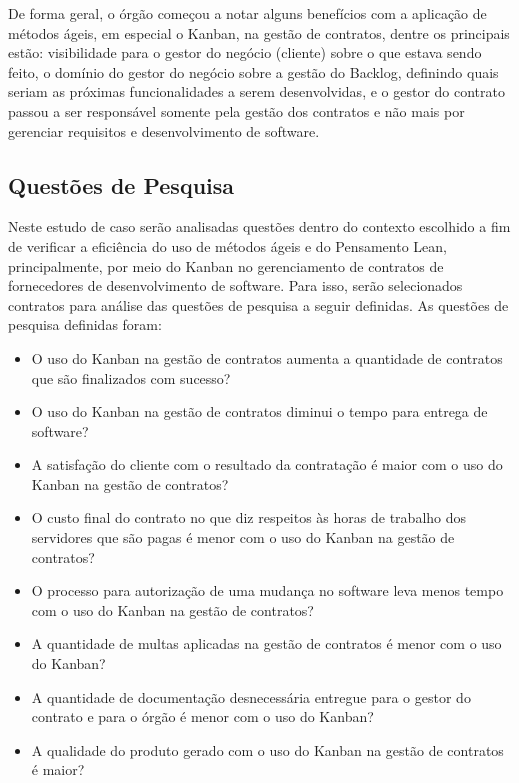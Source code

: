De forma geral, o órgão começou a notar alguns benefícios com a aplicação de métodos ágeis, em especial o Kanban, na gestão de contratos, dentre os principais estão: visibilidade para o gestor do negócio (cliente) sobre o que estava sendo feito, o domínio do gestor do negócio sobre a gestão do Backlog, definindo quais seriam as próximas funcionalidades a serem desenvolvidas, e o gestor do contrato passou a ser responsável somente pela gestão dos contratos e não mais por gerenciar requisitos e desenvolvimento de software.


\subsection[Questões de Pesquisa]{Questões de Pesquisa}

Neste estudo de caso serão analisadas questões dentro do contexto escolhido a fim de verificar a eficiência do uso de métodos ágeis e do Pensamento Lean, principalmente, por meio do Kanban no gerenciamento de contratos de fornecedores de desenvolvimento de software. Para isso, serão selecionados contratos para análise das questões de pesquisa a seguir definidas. As questões de pesquisa definidas foram:
\begin{itemize}
\item  O uso do Kanban na gestão de contratos aumenta a quantidade de contratos que são finalizados com sucesso?
\item  O uso do Kanban na gestão de contratos diminui o tempo para entrega de software?
\item	A satisfação do cliente com o resultado da contratação é maior com o uso do Kanban na gestão de contratos?
\item  O custo final do contrato no que diz respeitos às horas de trabalho dos servidores que são pagas é menor com o uso do Kanban na gestão de contratos?
\item  O processo para autorização de uma mudança no software leva menos tempo com o uso do Kanban na gestão de contratos?
\item	A quantidade de multas aplicadas na gestão de contratos é menor com o uso do Kanban?
\item	A quantidade de documentação desnecessária entregue para o gestor do contrato e para o órgão é menor com o uso do Kanban?
\item  A qualidade do produto gerado com o uso do Kanban na gestão de contratos é maior?
\end{itemize}

